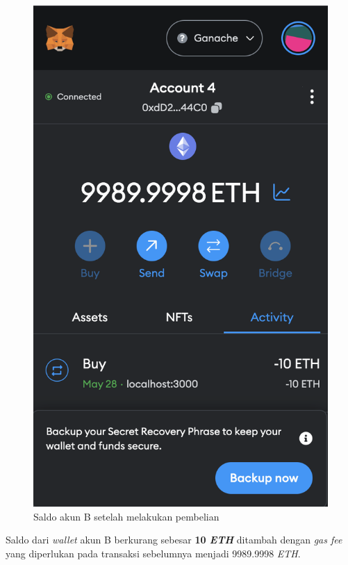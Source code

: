 \begin{itemize}
\begin{figure} [H]
        \includegraphics[scale=0.4]{gambar/img-test-buy-buy-3.png}
        \caption{Saldo akun B setelah melakukan pembelian}
        \label{fig:TestBuyHasilPembelian3}
      \end{figure}
    Saldo dari \emph{wallet} akun B berkurang sebesar \textbf{10 \emph{ETH}} ditambah dengan \emph{gas fee} yang diperlukan pada transaksi sebelumnya menjadi 9989.9998 \emph{ETH}.
    \begin{figure} [H] \centering

\end{figure}
\end{itemize}
